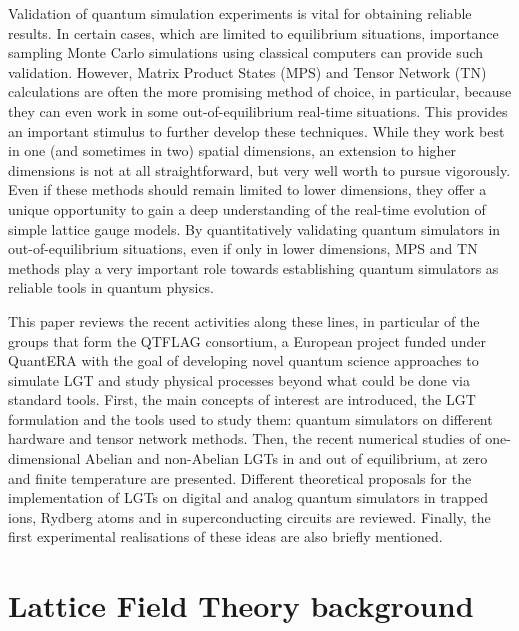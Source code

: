 \documentclass[epj,final]{svjour}
\begin{document}
Validation of quantum simulation experiments is vital for obtaining reliable results. In certain cases, which are limited to equilibrium situations, importance sampling Monte Carlo simulations using classical computers can provide such validation. However, Matrix Product States (MPS) and Tensor Network (TN) calculations are often the more promising method of choice, in particular, because they can even work in some out-of-equilibrium real-time situations. This provides an important stimulus to further develop these techniques. While they work best in one (and sometimes in two) spatial dimensions, an extension to higher dimensions is not at all straightforward, but very well worth to pursue vigorously. Even if these methods should remain limited to lower dimensions, they offer a unique opportunity to gain a deep understanding of the real-time evolution of simple lattice gauge models. By quantitatively validating quantum simulators in out-of-equilibrium situations, even if only in lower dimensions, MPS and TN methods play a very important role towards establishing quantum simulators as reliable tools in quantum physics.

This paper reviews the recent activities along these lines, in particular of the groups that form the QTFLAG consortium, a European project funded under QuantERA with the goal of developing novel quantum science approaches to simulate LGT and study physical processes beyond what could be done via standard tools. First, the main concepts of interest are introduced, the LGT formulation and the tools used to study them: quantum simulators on different hardware and tensor network methods. Then, the recent numerical studies of one-dimensional Abelian and non-Abelian LGTs in and out of equilibrium, at zero and finite temperature are presented. Different theoretical proposals for the implementation of LGTs on digital and analog quantum simulators in trapped ions, Rydberg atoms and in superconducting circuits are reviewed. Finally, the first experimental realisations of these ideas are also briefly mentioned. 

\section{Lattice Field Theory background}
\label{LFT}
\end{document}

